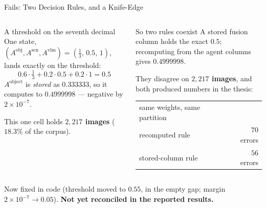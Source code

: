 \documentclass[aspectratio=169,11pt]{beamer}
\begin{document}
\begin{frame}{Fails: Two Decision Rules, and a Knife-Edge}
\begin{columns}[T]
\begin{alertblock}{\small A threshold on the seventh decimal}
\footnotesize One state, $(A^{\text{obj}},A^{\text{scn}},A^{\text{vlm}}) = (\tfrac13,\,0.5,\,1)$, lands exactly on the threshold:
\[
0.6\cdot\tfrac13 + 0.2\cdot0.5 + 0.2\cdot1 = 0.5
\]
$A^{\text{object}}$ is \emph{stored} as $0.333333$, so it computes to $\mathbf{0.4999998}$ --- negative by $2\times10^{-7}$.
\vspace{1mm}

This one cell holds \textbf{$2{,}217$ images} ($18.3\%$ of the corpus).
\end{alertblock}

\begin{alertblock}{\small So two rules coexist}
\footnotesize A stored fusion column holds the exact $0.5$; recomputing from the agent columns gives $0.4999998$.
\vspace{1mm}

They disagree on \textbf{$2{,}217$ images}, and both produced numbers in the thesis:
\vspace{1mm}
\begin{center}
\begin{tabular}{@{}l r@{}}
same weights, same partition & \\
\quad recomputed rule & $70$ errors \\
\quad stored-column rule & $56$ errors \\
\end{tabular}
\end{center}
\end{alertblock}
\end{columns}
\vspace{1mm}
\footnotesize Now fixed in code (threshold moved to $0.55$, in the empty gap; margin $2\times10^{-7}\to0.05$). \textbf{Not yet reconciled in the reported results.}
\end{frame}
\end{document}
